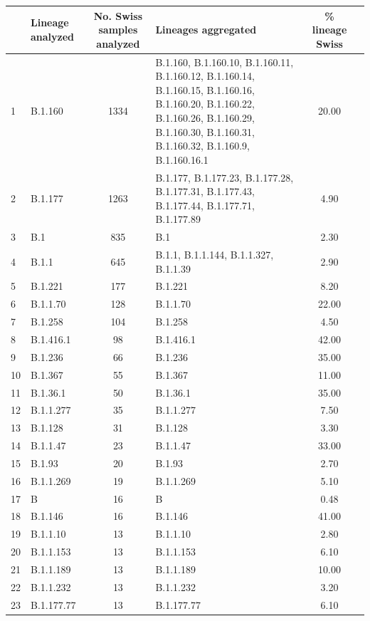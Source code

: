 \documentclass[9pt,twoside,lineno]{pnas-new}
\begin{document}
\begin{longtable}{llcp{4cm}cc}
  \hline
 & Lineage analyzed & No. Swiss samples analyzed & Lineages aggregated & \% lineage Swiss \\ 
  \hline
1 & B.1.160 & 1334 & B.1.160, B.1.160.10, B.1.160.11, B.1.160.12, B.1.160.14, B.1.160.15, B.1.160.16, B.1.160.20, B.1.160.22, B.1.160.26, B.1.160.29, B.1.160.30, B.1.160.31, B.1.160.32, B.1.160.9, B.1.160.16.1 & 20.00 \\ 
  2 & B.1.177 & 1263 & B.1.177, B.1.177.23, B.1.177.28, B.1.177.31, B.1.177.43, B.1.177.44, B.1.177.71, B.1.177.89 & 4.90 \\ 
  3 & B.1 & 835 & B.1 & 2.30 \\ 
  4 & B.1.1 & 645 & B.1.1, B.1.1.144, B.1.1.327, B.1.1.39 & 2.90 \\ 
  5 & B.1.221 & 177 & B.1.221 & 8.20 \\ 
  6 & B.1.1.70 & 128 & B.1.1.70 & 22.00 \\ 
  7 & B.1.258 & 104 & B.1.258 & 4.50 \\ 
  8 & B.1.416.1 &  98 & B.1.416.1 & 42.00 \\ 
  9 & B.1.236 &  66 & B.1.236 & 35.00 \\ 
  10 & B.1.367 &  55 & B.1.367 & 11.00 \\ 
  11 & B.1.36.1 &  50 & B.1.36.1 & 35.00 \\ 
  12 & B.1.1.277 &  35 & B.1.1.277 & 7.50 \\ 
  13 & B.1.128 &  31 & B.1.128 & 3.30 \\ 
  14 & B.1.1.47 &  23 & B.1.1.47 & 33.00 \\ 
  15 & B.1.93 &  20 & B.1.93 & 2.70 \\ 
  16 & B.1.1.269 &  19 & B.1.1.269 & 5.10 \\ 
  17 & B &  16 & B & 0.48 \\ 
  18 & B.1.146 &  16 & B.1.146 & 41.00 \\ 
  19 & B.1.1.10 &  13 & B.1.1.10 & 2.80 \\ 
  20 & B.1.1.153 &  13 & B.1.1.153 & 6.10 \\ 
  21 & B.1.1.189 &  13 & B.1.1.189 & 10.00 \\ 
  22 & B.1.1.232 &  13 & B.1.1.232 & 3.20 \\ 
  23 & B.1.177.77 &  13 & B.1.177.77 & 6.10 \\ 

\end{longtable}
\end{document}
